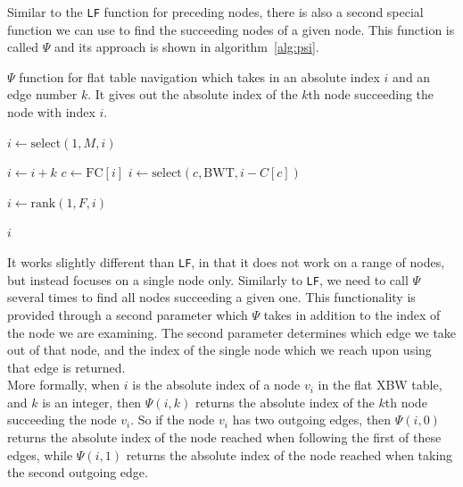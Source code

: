 \documentclass[a4paper,12pt,twoside,BCOR=10mm]{scrbook}
\begin{document}
Similar to the \texttt{LF} function for preceding nodes, there is also a second special function we can use 
to find the succeeding nodes of a given node. 
This function is called $ \Psi $ and its approach is shown in algorithm~\ref{alg:psi}. 
\begin{algorithm}
\caption[$ \Psi $ function for flat table navigation]{$ \Psi $ function for flat table navigation which takes in an absolute index $ i $ and an edge number $ k $. It gives out the absolute index of the $ k $th node succeeding the node with index $ i $.}
\label{alg:psi}
\begin{algorithmic}[1]

\State $ i \gets \textrm{select}(1, M, i) $

\State \phantom{nl}

\State $ i \gets i + k $
\State $ c \gets \textrm{FC} [ i ] $
\State $ i \gets \textrm{select}(c, \textrm{BWT}, i - C [ c ]) $

\State \phantom{nl}

\State $ i \gets \textrm{rank}(1, F, i) $

\State \phantom{nl}

\State \Return $ i $

\end{algorithmic}
\end{algorithm}
It works slightly different than \texttt{LF}, 
in that it does not work on a range of nodes, but instead focuses on a single node only. 
Similarly to \texttt{LF}, we need to call $ \Psi $ several times to find all nodes succeeding a given one. 
This functionality is provided through a second parameter which $ \Psi $ takes 
in addition to the index of the node we are examining. 
The second parameter determines which edge we take out of that node, 
and the index of the single node which we reach upon using that edge is returned. \\
More formally, when $ i $ is the absolute index of a node $ v_i $ in the flat XBW table, 
and $ k $ is an integer, then $ \Psi (i, k) $ returns the absolute index of the $ k $th node 
succeeding the node $ v_i $. So if the node $ v_i $ has two outgoing edges, 
then $ \Psi (i, 0) $ returns the absolute index of the node reached when following 
the first of these edges, while $ \Psi (i, 1) $ returns the absolute index of the node reached when 
taking the second outgoing edge. \\
\end{document}
